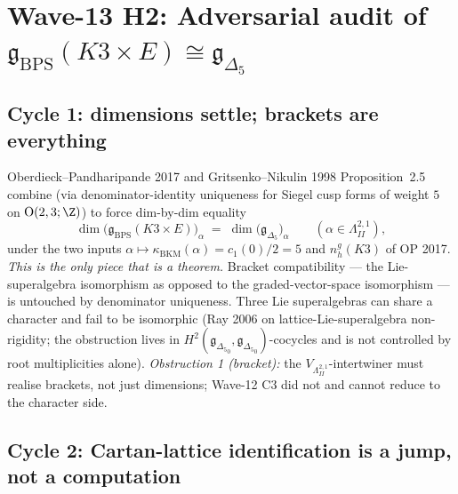 
\providecommand{\cat}{\mathrm{cat}}
\providecommand{\BKM}{\mathrm{BKM}}
\providecommand{\BPS}{\mathrm{BPS}}
\providecommand{\ch}{\mathrm{ch}}
\providecommand{\Muk}{\mathrm{Muk}}
\providecommand{\Coh}{\mathrm{Coh}}
\providecommand{\HM}{\mathrm{HM}}
\providecommand{\gBKM}{\mathfrak{g}_{\Delta_5}}
\providecommand{\gBPS}{\mathfrak{g}_{\BPS}(K3 \times E)}
\providecommand{\LambdaII}{\Lambda^{2,1}_{II}}

\section*{Wave-13 H2: Adversarial audit of
  $\gBPS \cong \gBKM$}

\subsection*{Cycle 1: dimensions settle; brackets are everything}

Oberdieck--Pandharipande 2017 and Gritsenko--Nikulin 1998
Proposition~2.5 combine (via denominator-identity uniqueness for
Siegel cusp forms of weight $5$ on $\mathrm{O}(2,3;\Z)$) to force
dim-by-dim equality
\[
  \dim \bigl(\gBPS\bigr)_\alpha
  \;=\; \dim \bigl(\gBKM\bigr)_\alpha
  \qquad
  (\alpha \in \LambdaII),
\]
under the two inputs $\alpha \mapsto \kappa_{\BKM}(\alpha) =
c_1(0)/2 = 5$ and $n^g_h(K3)$ of OP 2017. \emph{This is the only
piece that is a theorem.} Bracket compatibility --- the
Lie-superalgebra isomorphism as opposed to the graded-vector-space
isomorphism --- is untouched by denominator uniqueness. Three
Lie superalgebras can share a character and fail to be isomorphic
(Ray 2006 on lattice-Lie-superalgebra non-rigidity; the obstruction
lives in $H^2(\gBKM_0, \gBKM_0)$-cocycles and is not controlled by
root multiplicities alone). \emph{Obstruction 1 (bracket):} the
$V_{\LambdaII}$-intertwiner must realise brackets, not just
dimensions; Wave-12 C3 did not and cannot reduce to the character
side.

\subsection*{Cycle 2: Cartan-lattice identification is a jump, not
a computation}

